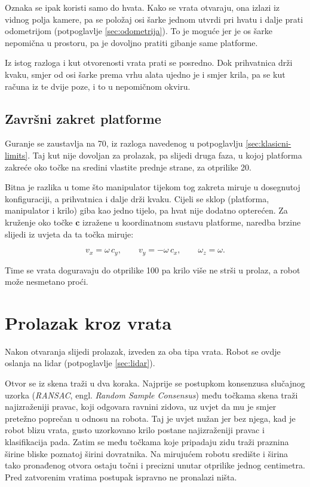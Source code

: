 Oznaka se ipak koristi samo do hvata. Kako se vrata otvaraju, ona izlazi iz vidnog polja kamere,
pa se položaj osi šarke jednom utvrdi pri hvatu i dalje prati odometrijom (potpoglavlje
\ref{sec:odometrija}). To je moguće jer je os šarke nepomična u prostoru, pa je dovoljno pratiti
gibanje same platforme.

Iz istog razloga i kut otvorenosti vrata prati se posredno. Dok prihvatnica drži kvaku, smjer od
osi šarke prema vrhu alata ujedno je i smjer krila, pa se kut računa iz te dvije poze, i to u
nepomičnom okviru.

\subsection{Završni zakret platforme}
\label{sec:zavrsni-zakret}

Guranje se zaustavlja na 70\textdegree{}, iz razloga navedenog u potpoglavlju
\ref{sec:klasicni-limits}. Taj kut nije dovoljan za prolazak, pa slijedi druga faza, u kojoj
platforma zakreće oko točke na sredini vlastite prednje strane, za otprilike 20\textdegree{}.

Bitna je razlika u tome što manipulator tijekom tog zakreta miruje u dosegnutoj konfiguraciji, a
prihvatnica i dalje drži kvaku. Cijeli se sklop (platforma, manipulator i krilo) giba kao
jedno tijelo, pa hvat nije dodatno opterećen. Za kruženje oko točke $\bm{c}$ izražene u
koordinatnom sustavu platforme, naredba brzine slijedi iz uvjeta da ta točka miruje:

\begin{equation}
      v_x = \omega\, c_y , \qquad v_y = -\omega\, c_x , \qquad \omega_z = \omega .
      \label{eq:pivot}
\end{equation}

Time se vrata doguravaju do otprilike 100\textdegree{} pa krilo više ne strši u prolaz, a
robot može nesmetano proći.

\section{Prolazak kroz vrata}
\label{sec:prolazak}

Nakon otvaranja slijedi prolazak, izveden za oba tipa vrata. Robot se ovdje oslanja na lidar
(potpoglavlje \ref{sec:lidar}).

Otvor se iz skena traži u dva koraka. Najprije se postupkom konsenzusa slučajnog uzorka
(\textit{RANSAC}, engl. \textit{Random Sample Consensus}) među točkama skena traži najizraženiji pravac,
koji odgovara ravnini zidova, uz uvjet da mu je smjer pretežno poprečan u odnosu na robota.
Taj je uvjet nužan jer bez njega, kad je robot blizu vrata, gusto uzorkovano krilo postane
najizraženiji pravac i klasifikacija pada. Zatim se među točkama koje pripadaju zidu
traži praznina širine bliske poznatoj širini dovratnika. Na mirujućem robotu središte i
širina tako pronađenog otvora ostaju točni i precizni unutar otprilike jednog centimetra.
Pred zatvorenim vratima postupak ispravno ne pronalazi ništa.

